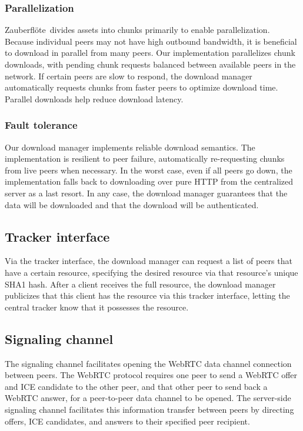\documentclass[letterpaper,twocolumn,10pt]{article}
\newcommand{\zbf}{Zauberfl\"{o}te}
\begin{document}
\subsubsection{Parallelization}

\zbf\ divides assets into chunks primarily to enable parallelization. Because
individual peers may not have high outbound bandwidth, it is beneficial to
download in parallel from many peers. Our implementation parallelizes chunk
downloads, with pending chunk requests balanced between available peers in the
network. If certain peers are slow to respond, the download manager
automatically requests chunks from faster peers to optimize download time.
Parallel downloads help reduce download latency.

\subsubsection{Fault tolerance}

Our download manager implements reliable download semantics. The implementation
is resilient to peer failure, automatically re-requesting chunks from live
peers when necessary. In the worst case, even if all peers go down, the
implementation falls back to downloading over pure HTTP from the centralized
server as a last resort. In any case, the download manager guarantees that the
data will be downloaded and that the download will be authenticated.

\subsection{Tracker interface}

Via the tracker interface, the download manager can request a list of peers that
have a certain resource, specifying the desired resource via that resource's
unique SHA1 hash. After a client receives the full resource, the download
manager publicizes that this client has the resource via this tracker interface,
letting the central tracker know that it possesses the resource.

\subsection{Signaling channel}

The signaling channel facilitates opening the WebRTC data channel connection between
peers. The WebRTC protocol requires one peer to send a WebRTC offer and ICE candidate
to the other peer, and that other peer to send back a WebRTC answer, for a peer-to-peer
data channel to be opened. The server-side signaling channel facilitates this
information transfer between peers by  directing offers, ICE candidates, and answers
to their specified peer recipient.
\end{document}
